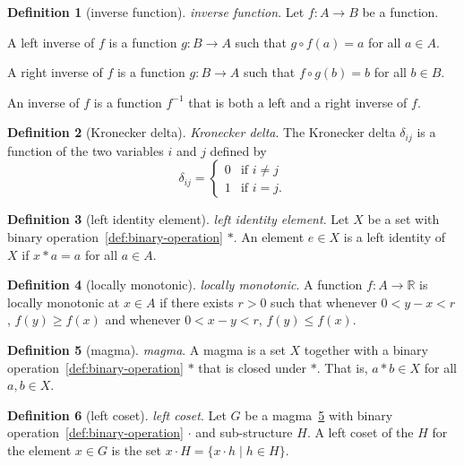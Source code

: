 \documentclass[12pt,a4paper]{article}
\theoremstyle{definition}
\newtheorem{definition}{Definition}
\begin{document}
\begin{definition}[inverse function]\label{def:inverse-function}
\emph{inverse function}. Let $f:A\to B$ be a function.

A left inverse of $f$ is a function $g:B\to A$ such that $g\circ f(a) = a$ for all $a \in A$.

A right inverse of $f$ is a function $g:B\to A$ such that $f\circ g(b) = b$ for all $b\in B$. 

An inverse of $f$ is a function $f^{-1}$ that is both a left and a right inverse of $f$.
\end{definition}

\begin{definition}[Kronecker delta]\label{def:kronecker-delta}
\emph{Kronecker delta}. The Kronecker delta $\delta_{ij}$ is a function of the two variables $i$ and $j$ defined by $$\delta_{ij} = \begin{cases}0 & \text{if }i\neq j \\ 1 & \text{if } i=j.\end{cases}$$
\end{definition}

\begin{definition}[left identity element]\label{def:left-identity-element}
\emph{left identity element}. Let $X$ be a set with binary operation~\ref{def:binary-operation} $*$. An element $e\in X$ is a left identity of $X$ if $x* a = a$ for all $a\in A$.
\end{definition}

\begin{definition}[locally monotonic]\label{def:locally-monotonic}
\emph{locally monotonic}. A function $f:A\to \mathbb R$ is locally monotonic at $x \in A$ if there exists $r>0$ such that whenever $0 < y-x < r$, $f(y)\geq f(x)$ and whenever $0 < x-y < r$, $f(y)\leq f(x)$.
\end{definition}

\begin{definition}[magma]\label{def:magma}
\emph{magma}. A magma is a set $X$ together with a binary operation~\ref{def:binary-operation} $*$ that is closed under $*$. That is, $a*b \in X$ for all $a,b \in X$.
\end{definition}

\begin{definition}[left coset]\label{def:left-coset}
\emph{left coset}. Let $G$ be a magma~\ref{def:magma} with binary operation~\ref{def:binary-operation} $\cdot$ and sub-structure $H$. A left coset of the $H$ for the element $x\in G$ is the set $x\cdot H = \{x\cdot h\mid h \in H\}$.
\end{definition}
\end{document}
